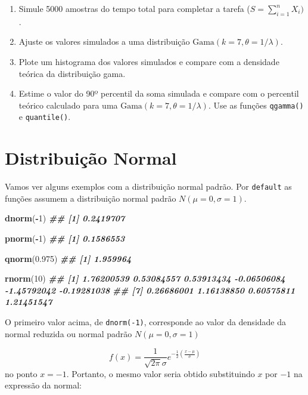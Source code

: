 \documentclass[
]{book}
\newenvironment{Shaded}{\begin{snugshade}}{\end{snugshade}}
\newcommand{\DecValTok}[1]{\textcolor[rgb]{0.00,0.00,0.81}{#1}}
\newcommand{\DocumentationTok}[1]{\textcolor[rgb]{0.56,0.35,0.01}{\textbf{\textit{#1}}}}
\newcommand{\FloatTok}[1]{\textcolor[rgb]{0.00,0.00,0.81}{#1}}
\newcommand{\FunctionTok}[1]{\textcolor[rgb]{0.13,0.29,0.53}{\textbf{#1}}}
\newcommand{\NormalTok}[1]{#1}
\newcommand{\SpecialCharTok}[1]{\textcolor[rgb]{0.81,0.36,0.00}{\textbf{#1}}}
\begin{document}
\begin{enumerate}
\def\labelenumi{(\alph{enumi})}
\item
  Simule 5000 amostras do tempo total para completar a tarefa (\(S = \sum_{i=1}^{n} X_i)\).
\item
  Ajuste os valores simulados a uma distribuição \(\text{Gama}(k = 7, \theta = 1/\lambda)\).
\item
  Plote um histograma dos valores simulados e compare com a densidade teórica da distribuição gama.
\item
  Estime o valor do 90º percentil da soma simulada e compare com o percentil teórico calculado para uma \(\text{Gama}(k=7, \theta=1/\lambda)\). Use as funções \texttt{qgamma()} e \texttt{quantile()}.
\end{enumerate}

\section{Distribuição Normal}\label{distribuiuxe7uxe3o-normal}

Vamos ver alguns exemplos com a distribuição normal padrão. Por \texttt{default} as funções assumem a distribuição normal padrão \(N(\mu=0, \sigma = 1)\).

\begin{Shaded}
\begin{Highlighting}[]
\FunctionTok{dnorm}\NormalTok{(}\SpecialCharTok{{-}}\DecValTok{1}\NormalTok{)}
\DocumentationTok{\#\# [1] 0.2419707}

\FunctionTok{pnorm}\NormalTok{(}\SpecialCharTok{{-}}\DecValTok{1}\NormalTok{)}
\DocumentationTok{\#\# [1] 0.1586553}

\FunctionTok{qnorm}\NormalTok{(}\FloatTok{0.975}\NormalTok{)}
\DocumentationTok{\#\# [1] 1.959964}

\FunctionTok{rnorm}\NormalTok{(}\DecValTok{10}\NormalTok{)}
\DocumentationTok{\#\#  [1]  1.76200539  0.53084557  0.53913434 {-}0.06506084 {-}1.45792042 {-}0.19281038}
\DocumentationTok{\#\#  [7]  0.26686001  1.16138850  0.60575811  1.21451547}
\end{Highlighting}
\end{Shaded}

O primeiro valor acima, de \texttt{dnorm(-1)}, corresponde ao valor da densidade da normal reduzida ou normal padrão \(N(\mu=0,\sigma=1)\)

\[f(x) = \frac{1}{\sqrt{2\pi}\sigma}e^{-\frac{1}{2}\left( \frac{x-\mu}{\sigma}\right)}\]
no ponto \(x=-1\). Portanto, o mesmo valor seria obtido substituindo \(x\) por \(-1\) na expressão da normal:
\end{document}
